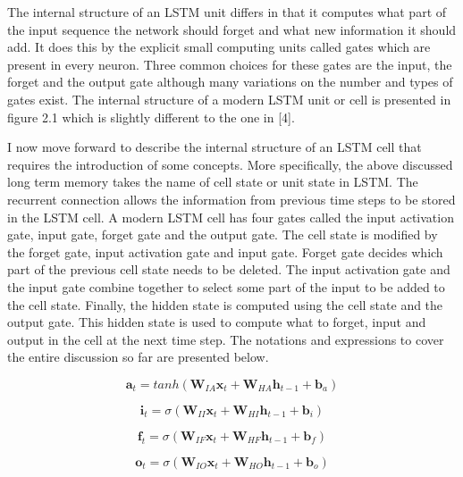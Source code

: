 The internal structure of an LSTM unit differs in that it computes what part of the input sequence the network should forget and what new information it should add. It does this by the explicit small computing units called gates which are present in every neuron. Three common choices for these gates are the input, the forget and the output gate although many variations on the number and types of gates exist. The internal structure of a modern LSTM unit or cell is presented in figure 2.1 which is slightly different to the one in [4].

I now move forward to describe the internal structure of an LSTM cell that requires the introduction of some concepts. More specifically, the above discussed long term memory takes the name of cell state or unit state in LSTM. The recurrent connection allows the information from previous time steps to be stored in the LSTM cell. A modern LSTM cell has four gates called the input activation gate, input gate, forget gate and the output gate. The cell state is modified by the forget gate, input activation gate and input gate. Forget gate decides which part of the previous cell state needs to be deleted. The input activation gate and the input gate combine together to select some part of the input to be added to the cell state. Finally, the hidden state is computed using the cell state and the output gate. This hidden state is used to compute what to forget, input and output in the cell at the next time step. The notations and expressions to cover the entire discussion so far are presented below.


\begin{equation}
\textbf{a}_t = tanh(\textbf{W}_{IA}\textbf{x}_{t}+\textbf{W}_{HA}\textbf{h}_{t-1}+\textbf{b}_{a})
\end{equation}


\begin{equation}
\textbf{i}_t = \sigma(\textbf{W}_{II}\textbf{x}_{t}+\textbf{W}_{HI}\textbf{h}_{t-1}+\textbf{b}_{i})
\end{equation}

\begin{equation}
\textbf{f}_t = \sigma(\textbf{W}_{IF}\textbf{x}_{t}+\textbf{W}_{HF}\textbf{h}_{t-1}+\textbf{b}_{f})
\end{equation}
  
\begin{equation}
\textbf{o}_t = \sigma(\textbf{W}_{IO}\textbf{x}_{t}+\textbf{W}_{HO}\textbf{h}_{t-1}+\textbf{b}_{o})
\end{equation}

